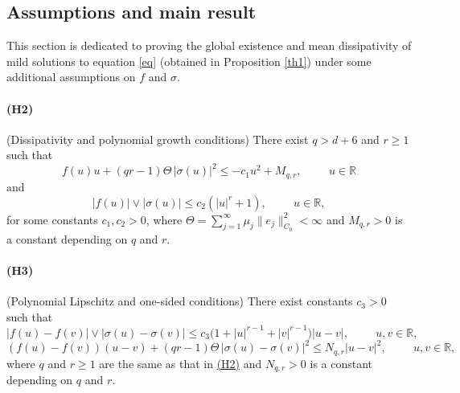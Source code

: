 \documentclass[10pt]{article}
\numberwithin{figure}{section}
\numberwithin{equation}{section}
\newcommand{\0}{{\theta}}
\def\be{\begin{equation}}
\def\ee{\end{equation}}
\def\sig{\sigma}
\def\R{\mathbb{R}}
\def\8{\infty}
\def\Hs{\hspace{1cm}}\def\hs{\hspace{0.5cm}}
\def\Vs{\vskip8pt}\def\vs{\vskip4pt}
\begin{document}
\subsection{Assumptions and main result}
This section is dedicated to proving  the global existence and mean dissipativity of mild solutions to equation \eqref{eq}  (obtained in Proposition \ref{th1}) under some additional assumptions on $f$ and $\sig$. 


\hypertarget{H}{}\paragraph{(H2)} \label{H2}
(Dissipativity and polynomial growth conditions) There exist $q>d+6$ and $r\ge1$ such that%
\begin{equation}\label{eq3.9}
f(u)u +(qr-1)\Theta\,|\sigma(u)|^2 \le -c_1 u^2 + M_{q,r}, \Hs  u \in \mathbb{R}
\end{equation}
and 
\be\label{eq4.16}|f(u)|\vee|\sig(u)|\le c_2(|u|^r+1),\Hs u\in\R,\ee
for some constants $c_1,c_2 > 0$, where $
\Theta = \sum_{j=1}^{\infty} \mu_j \|e_j\|_{C_0}^2<\8$ and $M_{q,r}>0$ is a constant depending on $q$ and $r$.
\Vs
\hypertarget{H}{}\paragraph{(H3)} \label{H3}
(Polynomial Lipschitz and one-sided conditions) There exist constants $c_3 > 0$ such that
\begin{equation}\label{eq3.5}
|f(u)-f(v)| \vee |\sigma(u)-\sigma(v)| \le c_3\big(1 + |u|^{r-1}+|v|^{r-1}\big)|u-v|, \Hs  u,v \in \mathbb{R},
\end{equation}
\be\label{eq4.5}
(f(u)-f(v))(u-v) + (qr-1)\Theta\,|\sigma(u)-\sigma(v)|^2 \le N_{q,r} |u-v|^2 , \Hs  u,v \in \mathbb{R},
\ee where $q$ and $r\geq1$ are the same as that in \hyperref[H2]{(H2)} and $N_{q,r}>0$ is a constant depending on $q$ and $r$.

\vs
\end{document}
